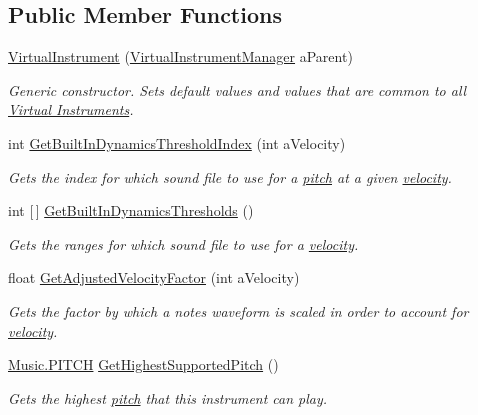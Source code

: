 \subsection*{Public Member Functions}
\begin{DoxyCompactItemize}
\item 
\hyperlink{group___v_i_base_construct_ga7b438b5f812fa0d3a6e91d74a3c261c9}{Virtual\+Instrument} (\hyperlink{class_virtual_instrument_manager}{Virtual\+Instrument\+Manager} a\+Parent)
\begin{DoxyCompactList}\small\item\em Generic constructor. Sets default values and values that are common to all \hyperlink{group___v_i}{Virtual Instruments}. \end{DoxyCompactList}\item 
int \hyperlink{group___v_i_base_pub_func_gacddf07c08c3a8154a6934be22f539788}{Get\+Built\+In\+Dynamics\+Threshold\+Index} (int a\+Velocity)
\begin{DoxyCompactList}\small\item\em Gets the index for which sound file to use for a \hyperlink{group___music_enums_ga508f69b199ea518f935486c990edac1d}{pitch} at a given \hyperlink{group___audio_DefVel}{velocity}. \end{DoxyCompactList}\item 
int \mbox{[}$\,$\mbox{]} \hyperlink{group___v_i_base_pub_func_gac8fc20c49c1b97b6787ed1b3e0073a7f}{Get\+Built\+In\+Dynamics\+Thresholds} ()
\begin{DoxyCompactList}\small\item\em Gets the ranges for which sound file to use for a \hyperlink{group___audio_DefVel}{velocity}. \end{DoxyCompactList}\item 
float \hyperlink{group___v_i_base_pub_func_gae638c68bd0e79d0b99495be69e50f49d}{Get\+Adjusted\+Velocity\+Factor} (int a\+Velocity)
\begin{DoxyCompactList}\small\item\em Gets the factor by which a note\textquotesingle{}s waveform is scaled in order to account for \hyperlink{group___audio_DefVel}{velocity}. \end{DoxyCompactList}\item 
\hyperlink{group___music_enums_ga508f69b199ea518f935486c990edac1d}{Music.\+P\+I\+T\+CH} \hyperlink{group___v_i_base_pub_func_ga859f3e73b1d28051cecf0ecd1c8b10ee}{Get\+Highest\+Supported\+Pitch} ()
\begin{DoxyCompactList}\small\item\em Gets the highest \hyperlink{group___music_enums_ga508f69b199ea518f935486c990edac1d}{pitch} that this instrument can play. \end{DoxyCompactList}\item 

\end{DoxyCompactItemize}
